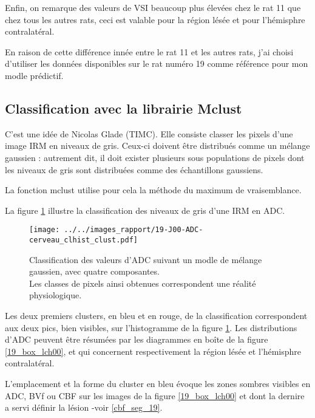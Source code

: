 \etoile
Enfin, on remarque des valeurs de VSI beaucoup plus \'elev\'ees chez le rat 11 que chez tous les autres rats, %
ceci est valable pour la r\'egion l\'es\'ee et pour l'h\'emisphre contralat\'eral.

\par
En raison de cette diff\'erence inn\'ee entre le rat 11 et les autres rats, %
j'ai choisi d'utiliser les donn\'ees disponibles sur le rat num\'ero 19 comme r\'ef\'erence pour mon modle pr\'edictif.

\FloatBarrier
\subsection{Classification avec la librairie Mclust}%

C'est une id\'ee de Nicolas Glade (TIMC). Elle consiste  classer les pixels d'une image IRM en niveaux de gris. %
Ceux-ci doivent \^etre distribu\'es comme un m\'elange gaussien : %
autrement dit, il doit exister plusieurs sous populations de pixels dont les niveaux de gris sont distribu\'ees comme des \'echantillons gaussiens.

\par
La fonction mclust utilise pour cela la m\'ethode du maximum de vraisemblance.

\par
La figure \ref{exem_ADC_19} illustre la classification des niveaux de gris d'une IRM en ADC.

\begin{figure}[H]
\texttt{[image: ../../images\_rapport/19-J00-ADC-cerveau\_clhist\_clust.pdf]}
\caption{Classification des valeurs d'ADC suivant un modle de m\'elange gaussien, avec quatre composantes.
\\
Les classes de pixels ainsi obtenues correspondent  une r\'ealit\'e physiologique.
}
\label{exem_ADC_19}
\end{figure}

\par
Les deux premiers clusters, en bleu et en rouge, de la classification correspondent aux deux pics, bien visibles, sur l'histogramme de la figure \ref{exem_ADC_19}. %
Les distributions d'ADC peuvent \^etre r\'esum\'ees par les diagrammes en bo\^ite de la figure \ref{19_box_lch00}, %
et qui concernent respectivement la r\'egion l\'es\'ee et l'h\'emisphre contralat\'eral.

\par
L'emplacement et la forme du cluster en bleu \'evoque les zones sombres visibles en ADC, BVf ou CBF sur les images de la figure \ref{19_box_lch00} %
et dont la dernire a servi  d\'efinir la l\'esion -voir \ref{cbf_seg_19}.

